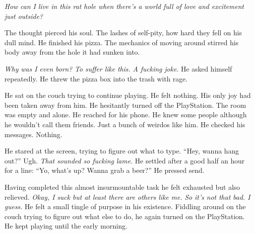 \textit{How can I live in this rat hole when there’s a world full of love and excitement just outside?}

The thought pierced his soul. The lashes of self-pity, how hard they fell on his dull mind. He finished his pizza. The mechanics of moving around stirred his body away from the hole it had sunken into.

\textit{Why was I even born? To suffer like this. A fucking joke.} He asked himself repeatedly. He threw the pizza box into the trash with rage.

He sat on the couch trying to continue playing. He felt nothing. His only joy had been taken away from him. He hesitantly turned off the PlayStation. The room was empty and alone. He reached for his phone. He knew some people although he wouldn’t call them friends. Just a bunch of weirdos like him. He checked his messages. Nothing.

He stared at the screen, trying to figure out what to type. “Hey, wanna hang out?” Ugh. \textit{That sounded so fucking lame.} He settled after a good half an hour for a line: “Yo, what’s up? Wanna grab a beer?” He pressed send.

Having completed this almost insurmountable task he felt exhausted but also relieved. \textit{Okay, I suck but at least there are others like me. So it’s not that bad. I guess.} He felt a small tingle of purpose in his existence. Fiddling around on the couch trying to figure out what else to do, he again turned on the PlayStation. He kept playing until the early morning.